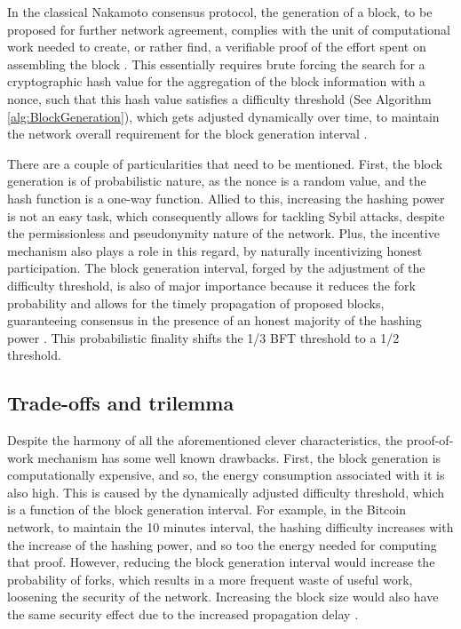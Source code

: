 \documentclass[journal]{IEEEtran}
\begin{document}
In the classical Nakamoto consensus protocol, the generation of a block, to be proposed
for further network agreement, complies with the unit of computational work needed to
create, or rather find, a verifiable proof of the effort spent on assembling the block \cite{nakamoto2008bitcoin}. 
This essentially requires brute forcing the search for a cryptographic hash value for the
aggregation of the block information with a nonce, such that this hash value satisfies
a difficulty threshold (See Algorithm \ref{alg:BlockGeneration}), which gets adjusted dynamically over time, to maintain the network overall 
requirement for the block generation interval \cite{8629877, survey-dist-consensus}.

There are a couple of particularities that need to be mentioned. First, the block generation
is of probabilistic nature, as the nonce is a random value, and the hash function is a one-way function.
Allied to this, increasing the hashing power is not an easy task, which consequently allows for tackling Sybil attacks,
despite the permissionless and pseudonymity nature of the network. Plus, the incentive mechanism
also plays a role in this regard, by naturally incentivizing honest participation.
The block generation interval, forged by the adjustment of the difficulty
threshold, is also of major importance because it reduces the fork probability and
allows for the timely propagation of proposed blocks, guaranteeing consensus
in the presence of an honest majority of the hashing power \cite{garay2015bitcoin, natoli2019deconstructing}.
This probabilistic finality shifts the 1/3 BFT threshold to a 1/2 threshold.

\subsection{Trade-offs and trilemma}

Despite the harmony of all the aforementioned clever characteristics,
the proof-of-work mechanism has some well known drawbacks. 
First, the block generation is computationally expensive, and so, the
energy consumption associated with it is also high. This is caused by the
dynamically adjusted difficulty threshold, which is a function of the block 
generation interval. For example, in the Bitcoin network, to maintain the 10 
minutes interval, the hashing difficulty
increases with the increase of the hashing power, and so too the energy needed for computing that proof. 
However, reducing the block generation interval would increase the
probability of forks, which results in a more frequent waste of useful work,
loosening the security of the network. Increasing the block size would also
have the same security effect due to the increased propagation delay \cite{8629877, natoli2019deconstructing}.
\end{document}
